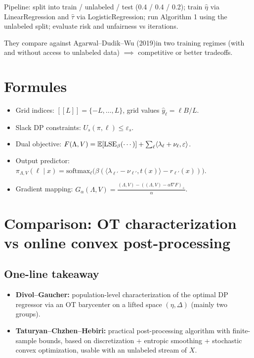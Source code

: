 \documentclass[11pt]{article}
\begin{document}
Pipeline:
split into train / unlabeled / test (0.4 / 0.4 / 0.2);
train $\widehat\eta$ via LinearRegression and $\widehat\tau$ via LogisticRegression;
run Algorithm 1 using the unlabeled split; evaluate risk and unfairness vs iterations.

They compare against Agarwal--Dudik--Wu (2019)in two training regimes
(with and without access to unlabeled data) $\implies$ competitive or better tradeoffs.

\section{Formules}
\begin{itemize}
  \item Grid indices: $[[L]]=\{-L,\ldots,L\}$, grid values $\widehat y_\ell=\ell B/L$.
  \item Slack DP constraints: $U_s(\pi,\ell)\le \varepsilon_s$.
  \item Dual objective: $F(\Lambda,V)=\mathbb{E}[\mathrm{LSE}_\beta(\cdots)]+\sum_\ell \langle\lambda_\ell+\nu_\ell,\varepsilon\rangle$.
  \item Output predictor: $\pi_{\Lambda,V}(\ell\mid x)=\mathrm{softmax}_\ell\big(\beta(\langle\lambda_{\ell'}-\nu_{\ell'},t(x)\rangle-r_{\ell'}(x))\big)$.
  \item Gradient mapping: $G_\alpha(\Lambda,V)=\frac{(\Lambda,V)-((\Lambda,V)-\alpha\nabla F)_+}{\alpha}$.
\end{itemize}

\newpage 
\section{Comparison: OT characterization vs online convex post-processing}

\subsection*{One-line takeaway}
\begin{itemize}
  \item \textbf{Divol--Gaucher:} population-level characterization of the optimal DP regressor via an OT barycenter
        on a lifted space $(\eta,\Delta)$ (mainly two groups).
  \item \textbf{Taturyan--Chzhen--Hebiri:} practical post-processing algorithm with finite-sample bounds,
        based on discretization + entropic smoothing + stochastic convex optimization, usable with an unlabeled stream of $X$.
\end{itemize}
\end{document}
